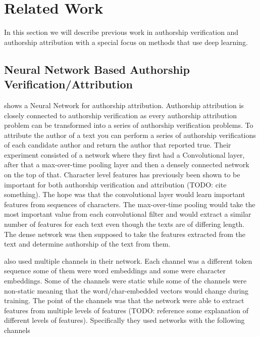 \section{Related Work} \label{sec:related_work}

In this section we will describe previous work in authorship verification and
authorship attribution with a special focus on methods that use deep learning.


\subsection{Neural Network Based Authorship Verification/Attribution}

\cite{DBLP:journals/corr/RuderGB16c} shows a Neural Network for authorship
attribution. Authorship attribution is closely connected to authorship
verification as every authorship attribution problem can be transformed into a
series of authorship verification problems. To attribute the author of a text
you can perform a series of authorship verifications of each candidate author
and return the author that reported true. Their experiment consisted of a
network where they first had a Convolutional layer, after that a max-over-time
pooling layer and then a densely connected network on the top of that. Character
level features has previously been shown to be important for both authorship
verification and attribution (TODO: cite something). The hope was that the
convolutional layer would learn important features from sequences of characters.
The max-over-time pooling would take the most important value from each
convolutional filter and would extract a similar number of features for each
text even though the texts are of differing length. The dense network was then
supposed to take the features extracted from the text and determine authorship
of the text from them.

\cite{DBLP:journals/corr/RuderGB16c} also used multiple channels in their
network. Each channel was a different token sequence some of them were word
embeddings and some were character embeddings. Some of the channels were static
while some of the channels were non-static meaning that the word/char-embedded
vectors would change during training. The point of the channels was that the
network were able to extract features from multiple levels of features (TODO:
reference some explanation of different levels of features). Specifically they
used networks with the following channels

